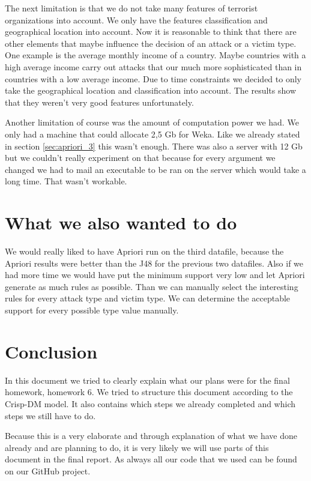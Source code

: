 \documentclass[a4]{article}
\begin{document}
The next limitation is that we do not take many features of terrorist organizations into account. We only have the features classification and geographical location into account. Now it is reasonable to think that there are other elements that maybe influence the decision of an attack or a victim type. One example is the average monthly income of a country. Maybe countries with a high average income carry out attacks that our much more sophisticated than in countries with a low average income. Due to time constraints we decided to only take the geographical location and classification into account. The results show that they weren't very good features unfortunately.\par
Another limitation of course was the amount of computation power we had. We only had a machine that could allocate 2,5 Gb for Weka. Like we already stated in section \ref{sec:apriori_3} this wasn't enough. There was also a server with 12 Gb but we couldn't really experiment on that because for every argument we changed we had to mail an executable to be ran on the server which would take a long time. That wasn't workable.
\section{What we also wanted to do}
We would really liked to have Apriori run on the third datafile, because the Apriori results were better than the J48 for the previous two datafiles. Also if we had more time we would have put the minimum support very low and let Apriori generate as much rules as possible. Than we can manually select the interesting rules for every attack type and victim type. We can determine the acceptable support for every possible type value manually.
\section{Conclusion}
\label{sec:conclusion}
In this document we tried to clearly explain what our plans were for the final homework, homework 6. We tried to structure this document according to the Crisp-DM model. It also contains which steps we already completed and which steps we still have to do.\par
Because this is a very elaborate and through explanation of what we have done already and are planning to do, it is very likely we will use parts of this document in the final report. As always all our code that we used can be found on our GitHub project\cite{githubproject}.
\printbibliography
\end{document}

